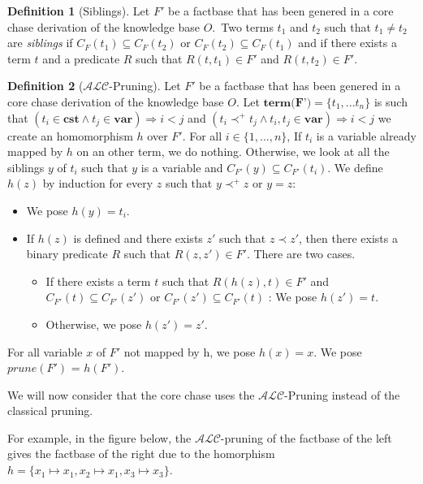 \documentclass{article}
\theoremstyle{definition}
\newtheorem{definition}{Definition}[section]
\theoremstyle{remark}
\newcommand{\TodoDavid}[1]{\todo[color=green!40]{#1}}
\begin{document}
\begin{definition}[Siblings]
Let $F'$ be a factbase that has been genered in a core chase derivation of the knowledge base $O$.\TodoDavid{Unclear sentence; discuss.}\ Two terms $t_1$ and $t_2$ such that $t_1 \neq t_2$ are \emph{siblings} if $C_F(t_1) \subseteq C_F(t_2)$ or $C_F(t_2) \subseteq C_F(t_1)$ and if there exists a term $t$ and a predicate $R$ such that $R(t,t_1) \in F'$ and $R(t,t_2) \in F'$.
\end{definition}

\begin{definition}[$\mathcal{ALC}$-Pruning]
Let $F'$ be a factbase that has been genered in a core chase derivation of the knowledge base $O$. Let $\textbf{term(F')} = \{t_1,...t_n\}$ is such that $(t_i \in \textbf{cst} \wedge t_j \in \textbf{var}) \Rightarrow i < j$ and $(t_i \prec^+ t_j \wedge t_i,t_j \in \textbf{var}) \Rightarrow i < j$
we create an homomorphism $h$ over $F'$.
For all $i \in \{1,...,n\}$,
If $t_i$ is a variable already mapped by $h$ on an other term, we do nothing.
Otherwise, we look at all the siblings $y$ of $t_i$ such that $y$ is a variable and $C_{F'}(y) \subseteq C_{F'}(t_i)$. We define $h(z)$ by induction for every $z$ such that $y \prec^+ z$ or $y = z$:
\begin{itemize}
\item We pose $h(y) = t_i$.
\item If $h(z)$ is defined and there exists $z'$ such that $z \prec z'$, then there exists a binary predicate $R$ such that $R(z,z') \in F'$. There are two cases.
\begin{itemize}
\item If there exists a term $t$ such that $R(h(z),t) \in F'$ and $C_{F'}(t) \subseteq C_{F'}(z')$ or $C_{F'}(z') \subseteq C_{F'}(t)$ : We pose $h(z') = t$.
\item Otherwise, we pose $h(z') = z'$. 
\end{itemize}
\end{itemize}
For all variable $x$ of $F'$ not mapped by h, we pose $h(x) = x$. We pose \emph{$\textit{prune}(F')$} = $h(F')$.
\end{definition}

We will now consider that the core chase uses the $\mathcal{ALC}$-Pruning instead of the classical pruning.

For example, in the figure below, the $\mathcal{ALC}$-pruning of the factbase of the left gives the factbase of the right due to the homorphism $h = \{x_1 \mapsto x_1, x_2 \mapsto x_1, x_3 \mapsto x_3\}$.
\end{document}

